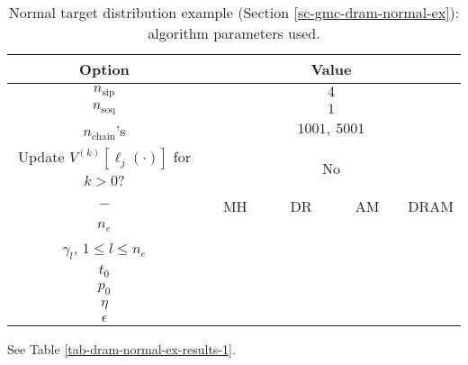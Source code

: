 \begin{table}[h!]
\begin{center}
\begin{tabular}{|c|c|c|c|c|}
\hline
Option                                            & \multicolumn{4}{c|}{Value}                                   \\
\hline
\hline
$n_{\text{sip}}$                                  & \multicolumn{4}{c|}{$4$}                                     \\
\hline
$n_{\text{soq}}$                                  & \multicolumn{4}{c|}{$1$}                                     \\
\hline
$n_{\text{chain}}$'s                              & \multicolumn{4}{c|}{$1001,~5001$}                            \\
\hline
Update $V^{(k)}[\ell_j(\cdot)]$ for $k>0$?        & \multicolumn{4}{c|}{No}                                      \\
\hline
\hline
$-$                                               & ~~MH~~            & ~~DR~~       & ~~AM~~       & DRAM       \\
\hline
$n_e$                                             &                   &              &              &            \\
\hline
$\gamma_l$,
$1\leqslant l\leqslant n_e$                       &                   &              &              &            \\
\hline
\hline
$t_0$                                             &                   &              &              &            \\
\hline
$p_0$                                             &                   &              &              &            \\
\hline
$\eta$                                            &                   &              &              &            \\
\hline
$\epsilon$                                        &                   &              &              &            \\
\hline
\end{tabular}
\caption{Normal target distribution example (Section \ref{sc-gmc-dram-normal-ex}):
algorithm parameters used.
}
\label{tab-dram-normal-ex-alg-params}
\end{center}
\end{table}

See Table \ref{tab-dram-normal-ex-results-1}.

